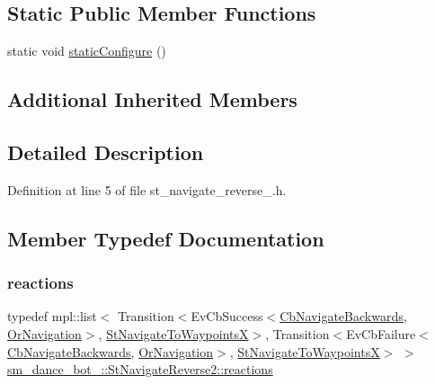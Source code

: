 \subsection*{Static Public Member Functions}
\begin{DoxyCompactItemize}
\item 
static void \hyperlink{structsm__dance__bot__2_1_1StNavigateReverse2_acef3a24cf17f19e5732fef608bc323a1}{static\+Configure} ()
\end{DoxyCompactItemize}
\subsection*{Additional Inherited Members}


\subsection{Detailed Description}


Definition at line 5 of file st\+\_\+navigate\+\_\+reverse\+\_.\+h.



\subsection{Member Typedef Documentation}
\mbox{\label{structsm__dance__bot__2_1_1StNavigateReverse2_afb84e7844ea33fac1d12ec7f243c8e65}} 
\subsubsection{\texorpdfstring{reactions}{reactions}}
{\footnotesize\ttfamily typedef mpl\+::list$<$ Transition$<$Ev\+Cb\+Success$<$\hyperlink{classcl__move__base__z_1_1CbNavigateBackwards}{Cb\+Navigate\+Backwards}, \hyperlink{classsm__dance__bot__2_1_1OrNavigation}{Or\+Navigation}$>$, \hyperlink{structsm__dance__bot__2_1_1StNavigateToWaypointsX}{St\+Navigate\+To\+WaypointsX}$>$, Transition$<$Ev\+Cb\+Failure$<$\hyperlink{classcl__move__base__z_1_1CbNavigateBackwards}{Cb\+Navigate\+Backwards}, \hyperlink{classsm__dance__bot__2_1_1OrNavigation}{Or\+Navigation}$>$, \hyperlink{structsm__dance__bot__2_1_1StNavigateToWaypointsX}{St\+Navigate\+To\+WaypointsX}$>$ $>$ \hyperlink{structsm__dance__bot__2_1_1StNavigateReverse2_afb84e7844ea33fac1d12ec7f243c8e65}{sm\+\_\+dance\+\_\+bot\+\_\+::\+St\+Navigate\+Reverse2\+::reactions}}



